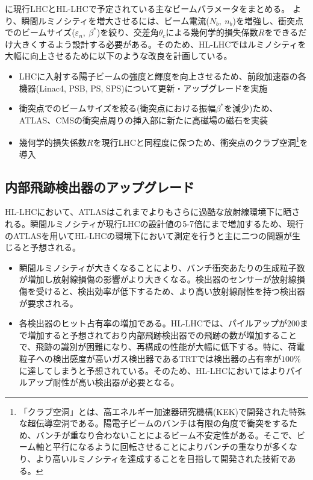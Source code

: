 に現行LHCとHL-LHCで予定されている主なビームパラメータをまとめる。
より、瞬間ルミノシティを増大させるには、ビーム電流($N_b,\ n_b$)を増強し、衝突点でのビームサイズ($\varepsilon_n,\ \beta^*$)を絞り、交差角$\theta_c$による幾何学的損失係数$R$をできるだけ大きくするよう設計する必要がある。そのため、HL-LHCではルミノシティを大幅に向上させるために以下のような改良を計画している。
\begin{itemize}
  \item LHCに入射する陽子ビームの強度と輝度を向上させるため、前段加速器の各機器(Linac4, PSB, PS, SPS)について更新・アップグレードを実施
  \item 衝突点でのビームサイズを絞る(衝突点における振幅$\beta^*$を減少)ため、ATLAS、CMSの衝突点周りの挿入部に新たに高磁場の磁石を実装
  \item 幾何学的損失係数$R$を現行LHCと同程度に保つため、衝突点のクラブ空洞\footnote{「クラブ空洞」とは、高エネルギー加速器研究機構(KEK)で開発された特殊な超伝導空洞である。陽電子ビームのバンチは有限の角度で衝突をするため、バンチが重なり合わないことによるビーム不安定性がある。そこで、ビーム軸と平行になるように回転させることによりバンチの重なりが多くなり、より高いルミノシティを達成することを目指して開発された技術である。\cite{crab}}を導入
\end{itemize}


\subsection{内部飛跡検出器のアップグレード}
\label{sec:hl-lhc-itk}
HL-LHCにおいて、ATLASはこれまでよりもさらに過酷な放射線環境下に晒される。瞬間ルミノシティが現行LHCの設計値の$5 \mathchar`- 7$倍にまで増加するため、現行のATLASを用いてHL-LHCの環境下において測定を行うと主に二つの問題が生じると予想される。
\begin{itemize}
\item 瞬間ルミノシティが大きくなることにより、バンチ衝突あたりの生成粒子数が増加し放射線損傷の影響がより大きくなる。検出器のセンサーが放射線損傷を受けると、検出効率が低下するため、より高い放射線耐性を持つ検出器が要求される。
\item 各検出器のヒット占有率の増加である。HL-LHCでは、パイルアップが$200$まで増加すると予想されており内部飛跡検出器での飛跡の数が増加することで、飛跡の識別が困難になり、再構成の性能が大幅に低下する。特に、荷電粒子への検出感度が高いガス検出器であるTRTでは検出器の占有率が$100\si{\%}$に達してしまうと予想されている。そのため、HL-LHCにおいてはよりパイルアップ耐性が高い検出器が必要となる。
\end{itemize}

